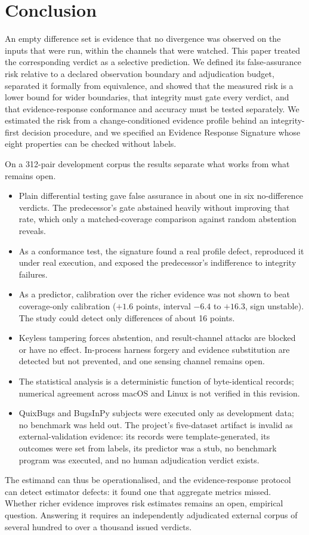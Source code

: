 \section{Conclusion}\label{sec:conclusion}

An empty difference set is evidence that no divergence was observed on the inputs that were run, within the channels that were watched. This paper treated the corresponding verdict as a selective prediction. We defined its false-assurance risk relative to a declared observation boundary and adjudication budget, separated it formally from equivalence, and showed that the measured risk is a lower bound for wider boundaries, that integrity must gate every verdict, and that evidence-response conformance and accuracy must be tested separately. We estimated the risk from a change-conditioned evidence profile behind an integrity-first decision procedure, and we specified an Evidence Response Signature whose eight properties can be checked without labels.

On a 312-pair development corpus the results separate what works from what remains open.
\begin{itemize}
\item Plain differential testing gave false assurance in about one in six no-difference verdicts. The predecessor's gate abstained heavily without improving that rate, which only a matched-coverage comparison against random abstention reveals.
\item As a conformance test, the signature found a real profile defect, reproduced it under real execution, and exposed the predecessor's indifference to integrity failures.
\item As a predictor, calibration over the richer evidence was not shown to beat coverage-only calibration ($+1.6$ points, interval $-6.4$ to $+16.3$, sign unstable). The study could detect only differences of about 16 points.
\item Keyless tampering forces abstention, and result-channel attacks are blocked or have no effect. In-process harness forgery and evidence substitution are detected but not prevented, and one sensing channel remains open.
\item The statistical analysis is a deterministic function of byte-identical records; numerical agreement across macOS and Linux is not verified in this revision.
\item QuixBugs and BugsInPy subjects were executed only as development data; no benchmark was held out. The project's five-dataset artifact is invalid as external-validation evidence: its records were template-generated, its outcomes were set from labels, its predictor was a stub, no benchmark program was executed, and no human adjudication verdict exists.
\end{itemize}

The estimand can thus be operationalised, and the evidence-response protocol can detect estimator defects: it found one that aggregate metrics missed. Whether richer evidence improves risk estimates remains an open, empirical question. Answering it requires an independently adjudicated external corpus of several hundred to over a thousand issued verdicts.
